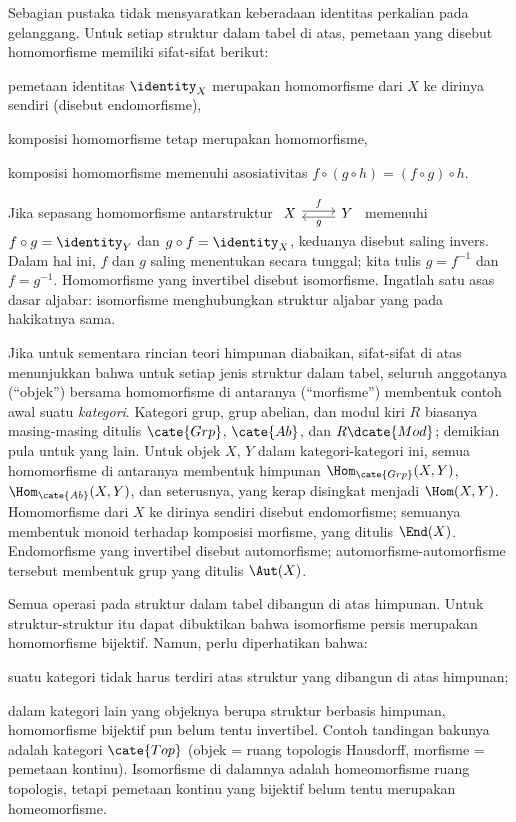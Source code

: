 Sebagian pustaka tidak mensyaratkan keberadaan identitas perkalian pada gelanggang. Untuk setiap struktur dalam tabel di atas, pemetaan yang disebut homomorfisme memiliki sifat-sifat berikut:
\begin{compactitem}
	\item pemetaan identitas $\identity_X$ merupakan homomorfisme dari $X$ ke dirinya sendiri (disebut endomorfisme),
	\item komposisi homomorfisme tetap merupakan homomorfisme,
	\item komposisi homomorfisme memenuhi asosiativitas $f \circ (g \circ h)=(f \circ g) \circ h$.
\end{compactitem}
Jika sepasang homomorfisme antarstruktur $\begin{tikzcd} X \arrow[yshift=0.5ex, r, "f"] & Y \arrow[yshift=-0.5ex, l, "g"]\end{tikzcd}$ memenuhi $f \circ g = \identity_Y$ dan $g \circ f = \identity_X$, keduanya disebut saling invers. Dalam hal ini, $f$ dan $g$ saling menentukan secara tunggal; kita tulis $g = f^{-1}$ dan $f = g^{-1}$. Homomorfisme yang invertibel disebut isomorfisme. Ingatlah satu asas dasar aljabar: isomorfisme menghubungkan struktur aljabar yang pada hakikatnya sama.

Jika untuk sementara rincian teori himpunan diabaikan, sifat-sifat di atas menunjukkan bahwa untuk setiap jenis struktur dalam tabel, seluruh anggotanya (``objek'') bersama homomorfisme di antaranya (``morfisme'') membentuk contoh awal suatu \emph{kategori}. Kategori grup, grup abelian, dan modul kiri $R$ biasanya masing-masing ditulis $\cate{Grp}$, $\cate{Ab}$, dan $R\dcate{Mod}$; demikian pula untuk yang lain. Untuk objek $X$, $Y$ dalam kategori-kategori ini, semua homomorfisme di antaranya membentuk himpunan $\Hom_{\cate{Grp}}(X,Y)$, $\Hom_{\cate{Ab}}(X,Y)$, dan seterusnya, yang kerap disingkat menjadi $\Hom(X, Y)$. Homomorfisme dari $X$ ke dirinya sendiri disebut endomorfisme; semuanya membentuk monoid terhadap komposisi morfisme, yang ditulis $\End(X)$. Endomorfisme yang invertibel disebut automorfisme; automorfisme-automorfisme tersebut membentuk grup yang ditulis $\Aut(X)$.

Semua operasi pada struktur dalam tabel dibangun di atas himpunan. Untuk struktur-struktur itu dapat dibuktikan bahwa isomorfisme persis merupakan homomorfisme bijektif. Namun, perlu diperhatikan bahwa:
\begin{compactitem}
	\item suatu kategori tidak harus terdiri atas struktur yang dibangun di atas himpunan;
	\item dalam kategori lain yang objeknya berupa struktur berbasis himpunan, homomorfisme bijektif pun belum tentu invertibel. Contoh tandingan bakunya adalah kategori $\cate{Top}$ (objek = ruang topologis Hausdorff, morfisme = pemetaan kontinu). Isomorfisme di dalamnya adalah homeomorfisme ruang topologis, tetapi pemetaan kontinu yang bijektif belum tentu merupakan homeomorfisme.
\end{compactitem}

